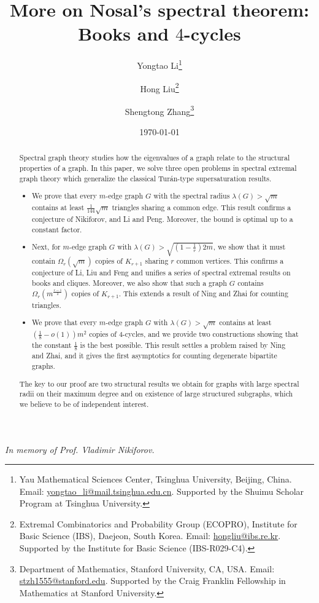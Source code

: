 \documentclass[11pt,a4paper]{article}
\title{More on Nosal's spectral theorem: Books and $4$-cycles}
\author{
Yongtao Li\thanks{Yau Mathematical Sciences Center, Tsinghua University, Beijing, China. Email: \url{yongtao_li@mail.tsinghua.edu.cn}. Supported by the Shuimu Scholar Program at Tsinghua University.}
\and
Hong Liu\thanks{Extremal Combinatorics and Probability Group (ECOPRO), Institute for Basic Science (IBS), Daejeon, South Korea. Email: \url{hongliu@ibs.re.kr}. Supported by the Institute for Basic Science (IBS-R029-C4).}
\and
Shengtong Zhang\thanks{Department of Mathematics, Stanford University, CA, USA. Email: \url{stzh1555@stanford.edu}. Supported by the Craig Franklin Fellowship in Mathematics at Stanford University.}
}
\date{\today}
\theoremstyle{definition}
\theoremstyle{remark}
\begin{document}
\maketitle


\begin{abstract}
Spectral graph theory studies how the eigenvalues of a graph relate to the structural properties of a graph. In this paper, we solve three open problems in spectral extremal graph theory which generalize the classical Tur\'{a}n-type supersaturation results.
   \begin{itemize}
    \item We prove that every $m$-edge graph $G$ with the spectral radius $\lambda (G) > \sqrt{m}$ contains at least $\frac{1}{144} \sqrt{m}$ triangles sharing a common edge. This result confirms a conjecture of Nikiforov, and Li and Peng. Moreover, the bound is optimal up to a constant factor.

    \item Next, for $m$-edge graph $G$ with $\lambda (G) > \sqrt{(1-\frac{1}{r})2m}$, we show that it must contain 
    $\Omega_r (\sqrt{m})$ copies of $K_{r+1}$ sharing $r$ common vertices. This confirms a conjecture of Li, Liu and Feng and unifies a series of spectral extremal results on books and cliques. Moreover, we also show that such a graph $G$ contains $\Omega_r  (m^{\frac{r-1}{2}})$ copies of $K_{r+1}$. This extends a result of Ning and Zhai for counting triangles. 

    \item We prove that every $m$-edge graph $G$ with $\lambda (G) > \sqrt{m}$ contains at least $(\frac{1}{8}-o(1)) m^2$ copies of 4-cycles, and we provide two constructions showing that the constant $\frac{1}{8}$ is the best possible. This result settles a problem raised by Ning and Zhai, and it gives the first asymptotics for counting degenerate bipartite graphs. 
   \end{itemize}
   The key to our proof are two structural results we obtain for graphs with large spectral radii on their maximum degree and on existence of large structured subgraphs, which we believe to be of independent interest.
\end{abstract}

\begin{center} \emph{In memory of Prof. Vladimir Nikiforov.} \end{center}

\end{document}
